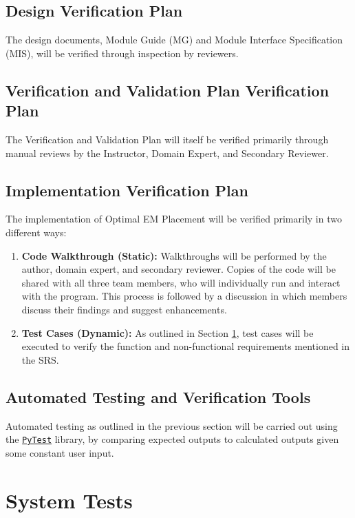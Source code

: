 \documentclass[12pt, titlepage]{article}
\begin{document}
\subsection{Design Verification Plan}
The design documents, Module Guide (MG) and Module Interface Specification (MIS), will be verified through inspection by reviewers. 

\subsection{Verification and Validation Plan Verification Plan}
The Verification and Validation Plan will itself be verified primarily through manual reviews by the Instructor, Domain Expert, and Secondary Reviewer.

\subsection{Implementation Verification Plan}
The implementation of Optimal EM Placement will be verified primarily in two different ways:
\begin{enumerate}
  \item \textbf{Code Walkthrough (Static): }Walkthroughs will be performed by the author, domain expert, and secondary reviewer. Copies of the code will be shared with all three team members, who will individually run and interact with the program. This process is followed by a discussion in which members discuss their findings and suggest enhancements. 
  \item \textbf{Test Cases (Dynamic): }As outlined in Section \ref{sys_tests}, test cases will be executed to verify the function and non-functional requirements mentioned in the SRS. 
\end{enumerate}

\subsection{Automated Testing and Verification Tools} \label{ver_tools}
Automated testing as outlined in the previous section will be carried out using the \href{https://docs.pytest.org/en/stable/}{\texttt{PyTest}} library, by comparing expected outputs to calculated outputs given some constant user input. 

\section{System Tests} \label{sys_tests}
\end{document}
